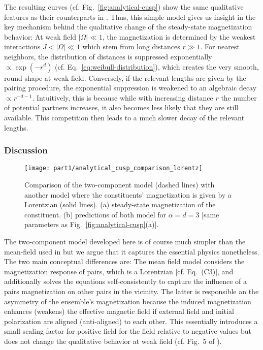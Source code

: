 The resulting curves (cf. Fig.~\ref{fig:analytical-cusp}) show the same qualitative features as their counterparts in \cite{franzEmergentPairLocalization2022}. Thus, this simple model gives us insight in the key mechanism behind the qualitative change of the steady-state magnetization behavior: At weak field $|\Omega|\ll 1$, the magnetization is determined by the weakest interactions $J<|\Omega|\ll 1$ which stem from long distances $r \gg 1$. For nearest neighbors, the distribution of distances is suppressed exponentially $\propto \exp(-r^d)$ (cf. Eq.~\ref{eq:weibull-distribution}), which creates the very smooth, round shape at weak field. Conversely, if the relevant lengths are given by the pairing procedure, the exponential suppression is weakened to an algebraic decay $\propto r^{-d-1}$. Intuitively, this is because while with increasing distance $r$ the number of potential partners increases, it also becomes less likely that they are still available. This competition then leads to a much slower decay of the relevant lengths.

\subsubsection{Discussion}

\begin{figure}[htb]
	\centering
	\texttt{[image: part1/analytical\_cusp\_comparison\_lorentz]}
	\caption{Comparison of the two-component model (dashed lines) with another model where the constituents' magnetization is given by a Lorentzian (solid lines). (a) steady-state magnetization of the constituent. (b) predictions of both model for $\alpha=d=3$ [same parameters as Fig.~\ref{fig:analytical-cusp}(a)].
	}
	\label{fig:analytical-cusp-comparison-lorentz}
\end{figure}

The two-component model developed here is of course much simpler than the mean-field used in \cite{franzEmergentPairLocalization2022} but we argue that it captures the essential physics nonetheless. The two main conceptual differences are: The mean field model considers the magnetization response of pairs, which is a Lorentzian [cf. Eq.~(C3)], and additionally solves the equations self-consistently to capture the influence of a pairs magnetization on other pairs in the vicinity. The latter is responsible an the asymmetry of the ensemble's magnetization because the induced magnetization enhances (weakens) the effective magnetic field if external field and initial polarization are aligned (anti-aligned) to each other. This essentially introduces a small scaling factor for positive field for the field relative to negative values but does not change the qualitative behavior at weak field (cf. Fig.~5 of \cite{franzEmergentPairLocalization2022}). 

